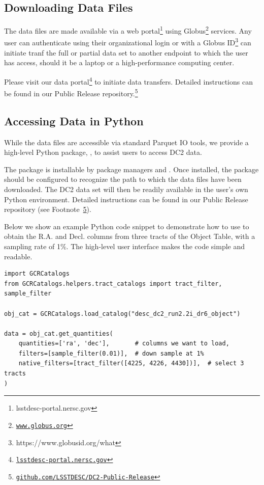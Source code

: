 \documentclass[modern]{descnote}
\newcommand*{\https}[1]{\href{https://#1}{\nolinkurl{#1}}}
\begin{document}
\subsection{Downloading Data Files}
\label{sec:download}

The data files are made available via a web portal\footnote{lsstdesc-portal.nersc.gov} using Globus\footnote{\https{www.globus.org}} services. Any user can authenticate using their organizational login or with a Globus ID\footnote{https://www.globusid.org/what} can initiate tranf the full or partial data set to another endpoint to which the user has access, should it be a laptop or a high-performance computing center. 

Please visit our data portal\footnote{\https{lsstdesc-portal.nersc.gov}} to initiate data transfers. Detailed instructions can be found in our Public Release repository.\footnote{\https{github.com/LSSTDESC/DC2-Public-Release}\label{fn:repo}}

\subsection{Accessing Data in Python}
\label{sec:gcr}

While the data files are accessible via standard Parquet IO tools, we provide a high-level Python package, , to assist users to access DC2 data. 

The  package is installable by package managers  and .
Once installed, the package should be configured to recognize the path to which the data files have been downloaded. The DC2 data set will then be readily available in the user's own Python environment. 
Detailed instructions can be found in our Public Release repository (see Footnote~\ref{fn:repo}).

Below we show an example Python code snippet to demonstrate how to use  to obtain the R.A. and Decl. columns from three tracts of the Object Table, with a sampling rate of 1\%. The high-level user interface makes the code simple and readable. 

\begin{verbatim}
import GCRCatalogs
from GCRCatalogs.helpers.tract_catalogs import tract_filter, sample_filter

obj_cat = GCRCatalogs.load_catalog("desc_dc2_run2.2i_dr6_object")

data = obj_cat.get_quantities(
    quantities=['ra', 'dec'],       # columns we want to load, 
    filters=[sample_filter(0.01)],  # down sample at 1%
    native_filters=[tract_filter([4225, 4226, 4430])],  # select 3 tracts
)
\end{verbatim}
\end{document}
